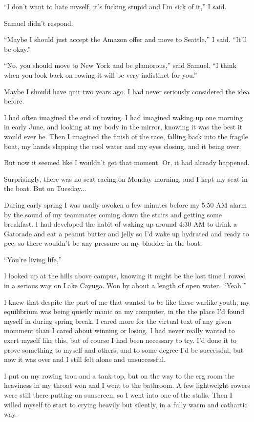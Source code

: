 ``I don't want to hate myself, it's fucking stupid and I'm sick of it,'' I said.  

Samuel didn't respond.

``Maybe I should just accept the Amazon offer and move to Seattle,'' I said.
``It'll be okay.''

``No, you should move to New York and be glamorous,'' said Samuel.  ``I think
when you look back on rowing it will be very indistinct for you.'' 

Maybe I should have quit two years ago.  I had never seriously considered the
idea before.

I had often imagined the end of rowing.  I had imagined waking up one morning in
early June, and looking at my body in the mirror, knowing it was the best it
would ever be.  Then I imagined  the finish of the race, falling back into the
fragile boat, my hands slapping the cool water and my eyes closing, and it being
over.

But now it seemed like I wouldn't get that moment.  Or, it had already happened.

Surprisingly, there was no seat racing on Monday morning, and I kept my seat in
the boat.  But on Tuesday...

During early spring I was usally awoken a few minutes before my 5:50 AM alarm by
the sound of my teammates coming down the stairs and getting some breakfast.  I
had developed the habit of waking up around 4:30 AM to drink a Gatorade and eat
a peanut butter and jelly so I'd wake up hydrated and ready to pee, so there
wouldn't be any pressure on my bladder in the boat. 

``You're living life,''

I looked up at the hills above campus, knowing it might be the last time I rowed
in a serious way on Lake Cayuga.  Won by about a length of open water.  ``Yeah
'' 

I knew that despite the part of me that wanted to be like these warlike youth,
my equilibrium was being quietly manic on my computer, in the the place I'd
found myself in during spring break.  I cared more for the virtual text of any
given momment than I cared about winning or losing.  I had never really wanted
to exert myself like this, but of course I had been necessary to try.  I'd done
it to prove something to myself and others, and to some degree I'd be
successful, but now it was over and I still felt alone and unsuccessful.

I put on my rowing trou and a tank top, but on the way to the erg room the
heaviness in my throat won and I went to the bathroom.  A few lightweight
rowers were still there putting on sunscreen, so I went into one of the stalls.
Then I willed myself to start to crying heavily but silently, in a fully warm
and cathartic way.  

